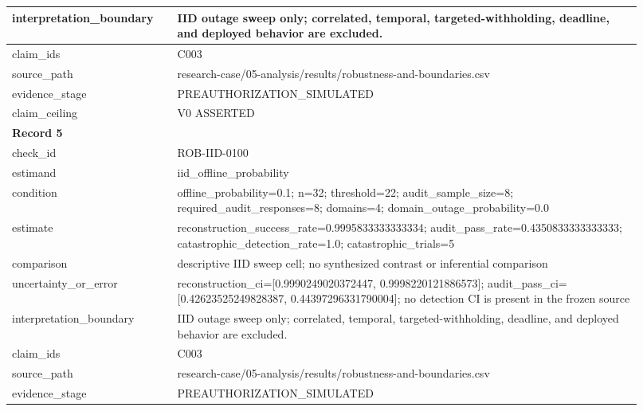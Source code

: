 \begin{longtable}{|p{0.24\linewidth}|p{0.68\linewidth}|}
interpretation\_\allowbreak{}boundary & IID outage sweep only;\allowbreak{} correlated, temporal, targeted-withholding, deadline, and deployed behavior are excluded. \\ \hline
claim\_\allowbreak{}ids & C003 \\ \hline
source\_\allowbreak{}path & research-case/05-analysis/results/robustness-and-boundaries.csv \\ \hline
evidence\_\allowbreak{}stage & PREAUTHORIZATION\_\allowbreak{}SIMULATED \\ \hline
claim\_\allowbreak{}ceiling & V0 ASSERTED \\ \hline
\multicolumn{2}{|l|}{\textbf{Record 5}} \\ \hline
check\_\allowbreak{}id & ROB-IID-0100 \\ \hline
estimand & iid\_\allowbreak{}offline\_\allowbreak{}probability \\ \hline
condition & offline\_\allowbreak{}probability=0.1;\allowbreak{} n=32;\allowbreak{} threshold=22;\allowbreak{} audit\_\allowbreak{}sample\_\allowbreak{}size=8;\allowbreak{} required\_\allowbreak{}audit\_\allowbreak{}responses=8;\allowbreak{} domains=4;\allowbreak{} domain\_\allowbreak{}outage\_\allowbreak{}probability=0.0 \\ \hline
estimate & reconstruction\_\allowbreak{}success\_\allowbreak{}rate=0.9995833333333334;\allowbreak{} audit\_\allowbreak{}pass\_\allowbreak{}rate=0.4350833333333333;\allowbreak{} catastrophic\_\allowbreak{}detection\_\allowbreak{}rate=1.0;\allowbreak{} catastrophic\_\allowbreak{}trials=5 \\ \hline
comparison & descriptive IID sweep cell;\allowbreak{} no synthesized contrast or inferential comparison \\ \hline
uncertainty\_\allowbreak{}or\_\allowbreak{}error & reconstruction\_\allowbreak{}ci=[0.9990249020372447, 0.9998220121886573];\allowbreak{} audit\_\allowbreak{}pass\_\allowbreak{}ci=[0.42623525249828387, 0.44397296331790004];\allowbreak{} no detection CI is present in the frozen source \\ \hline
interpretation\_\allowbreak{}boundary & IID outage sweep only;\allowbreak{} correlated, temporal, targeted-withholding, deadline, and deployed behavior are excluded. \\ \hline
claim\_\allowbreak{}ids & C003 \\ \hline
source\_\allowbreak{}path & research-case/05-analysis/results/robustness-and-boundaries.csv \\ \hline
evidence\_\allowbreak{}stage & PREAUTHORIZATION\_\allowbreak{}SIMULATED \\ \hline

\end{longtable}
